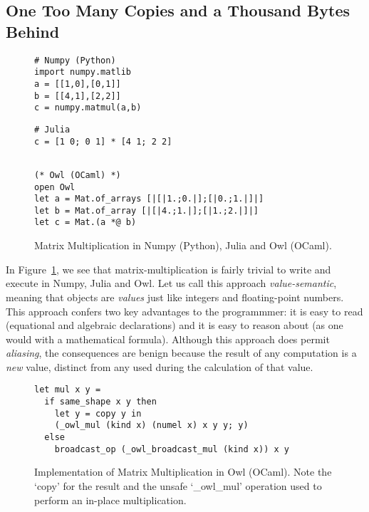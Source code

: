 \subsection{One Too Many Copies and a Thousand Bytes Behind}
\begin{figure}[tbp]
    \centering
    \begin{verbatim}
# Numpy (Python)
import numpy.matlib
a = [[1,0],[0,1]]
b = [[4,1],[2,2]]
c = numpy.matmul(a,b)
    \end{verbatim}
    \begin{verbatim}
# Julia
c = [1 0; 0 1] * [4 1; 2 2]
    \end{verbatim}
    \begin{verbatim}

(* Owl (OCaml) *)
open Owl
let a = Mat.of_arrays [|[|1.;0.|];[|0.;1.|]|]
let b = Mat.of_array [|[|4.;1.|];[|1.;2.|]|]
let c = Mat.(a *@ b)
    \end{verbatim}
    \caption{Matrix Multiplication in Numpy (Python), Julia and Owl (OCaml).}\label{fig:mat_mul_copies}
\end{figure}

In Figure~\ref{fig:mat_mul_copies}, we see that matrix-multiplication is fairly
trivial to write and execute in Numpy, Julia and Owl. Let us call this approach
\emph{value-semantic}, meaning that objects are \emph{values} just like
integers and floating-point numbers. This approach confers two key advantages to the
programmmer: it is easy to read (equational and algebraic declarations) and it
is easy to reason about (as one would with a mathematical formula). Although this
approach does permit \emph{aliasing}, the consequences are benign because the
result of any computation is a \emph{new} value, distinct from any used during
the calculation of that value.

\begin{figure}[tbp]
    \centering
    \begin{verbatim}
let mul x y =
  if same_shape x y then
    let y = copy y in
    (_owl_mul (kind x) (numel x) x y y; y)
  else
    broadcast_op (_owl_broadcast_mul (kind x)) x y
    \end{verbatim}
    \caption{Implementation of Matrix Multiplication in Owl (OCaml).
        Note the `copy' for the result and the unsafe `\_owl\_mul' operation
    used to perform an in-place multiplication.}\label{fig:mat_mul_owl}
\end{figure}

